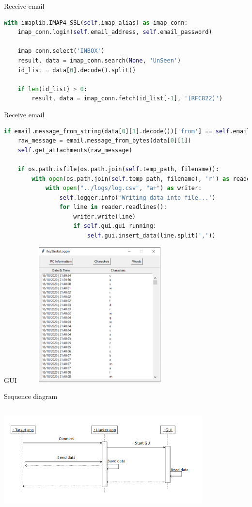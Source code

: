 \documentclass{beamer}
\begin{document}
\begin{frame}[fragile]{Receive email}
\begin{lstlisting}[language=Python]
with imaplib.IMAP4_SSL(self.imap_alias) as imap_conn:
	imap_conn.login(self.email_address, self.email_password)
	
	imap_conn.select('INBOX')
	result, data = imap_conn.search(None, 'UnSeen')
	id_list = data[0].decode().split()
	
	if len(id_list) > 0:
		result, data = imap_conn.fetch(id_list[-1], '(RFC822)')
\end{lstlisting}
\end{frame}

\begin{frame}[fragile]{Receive email}
\begin{lstlisting}[language=Python]
if email.message_from_string(data[0][1].decode())['from'] == self.email_address:
	raw_message = email.message_from_bytes(data[0][1])
	self.get_attachments(raw_message)
	
	if os.path.isfile(os.path.join(self.temp_path, filename)):
		with open(os.path.join(self.temp_path, filename), 'r') as reader:
			with open("../logs/log.csv", "a+") as writer:
				self.logger.info('Writing data into file...')
				for line in reader.readlines():
					writer.write(line)
					if self.gui.gui_running:
						self.gui.insert_data(line.split(','))
\end{lstlisting}
\end{frame}

\begin{frame}{GUI}
\centering
\includegraphics[width=250pt, height=210pt]{../images/GUI final}
\end{frame}

\begin{frame}{Sequence diagram}
\includegraphics[width=307pt, height=180pt]{../images/startup diagram}
\end{frame}
\end{document}
